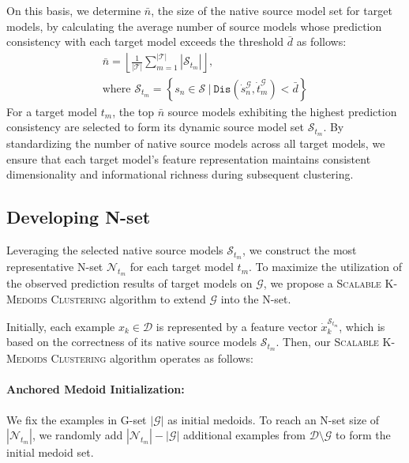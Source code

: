 On this basis, we determine $\bar{n}$, the size of the native source model set for target models, by calculating the average number of source models whose prediction consistency with each target model exceeds the threshold $\bar{d}$ as follows:
\begin{equation}
    \begin{gathered}
    \bar{n} = \left\lfloor \frac{1}{|\mathcal{T}|} \sum_{m=1}^{|\mathcal{T}|} |\mathcal{S}_{t_m}| \right\rfloor \label{eq:bar_n}, \\
    \text{where } \mathcal{S}_{t_m} = \left\{ s_n \in \mathcal{S} \ \bigg| \ \texttt{Dis}\left(\dot{s}_n^{\mathcal{G}}, \dot{t}_m^{\mathcal{G}}\right) < \bar{d} \right\}   
    \end{gathered}
\end{equation}
For a target model $t_m$, the top $\bar{n}$ source models exhibiting the highest prediction consistency are selected to form its dynamic source model set $\mathcal{S}_{t_m}$. By standardizing the number of native source models across all target models, we ensure that each target model's feature representation maintains consistent dimensionality and informational richness during subsequent clustering.

\subsection{Developing N-set}
\label{sec:N-set}

Leveraging the selected native source models $\mathcal{S}_{t_m}$, we construct the most representative N-set $\mathcal{N}_{t_m}$ for each target model $t_m$. To maximize the utilization of the observed prediction results of target models on $\mathcal{G}$, we propose a \textsc{Scalable K-Medoids Clustering} algorithm to extend $\mathcal{G}$ into the N-set. 

Initially, each example $x_k \in \mathcal{D}$ is represented by a feature vector $\dot{x}_k^{\mathcal{S}_{t_m}}$, which is based on the correctness of its native source models $\mathcal{S}_{t_m}$. Then, our \textsc{Scalable K-Medoids Clustering} algorithm operates as follows:

\paragraph{Anchored Medoid Initialization:} We fix the examples in G-set $|\mathcal{G}|$ as initial medoids. To reach an N-set size of $|\mathcal{N}_{t_m}|$, we randomly add $|\mathcal{N}_{t_m}| - |\mathcal{G}|$ additional examples from $\mathcal{D} \setminus \mathcal{G}$ to form the initial medoid set.


